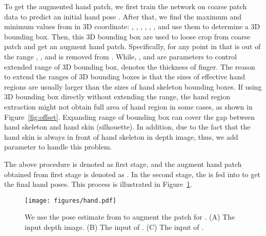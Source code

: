 \documentclass{article}
\begin{document}
To get the augmented hand patch, we first train the network  on coarse patch data  to predict an initial hand pose .
After that, we find the maximum and minimum values from  in 3D coordinate: , , , , , , and use them to determine a 3D bounding box.
Then, this 3D bounding box are used to loose crop from coarse patch and get an augment hand patch. Specifically, for any point  in  that is out of the range , , and  is removed from . While, ,  and  are parameters to control extended range of 3D bounding box,  denotes the thickness of finger.
The reason to extend the ranges of 3D bounding boxes is that the sizes of effective hand regions are usually larger than the sizes of hand skeleton bounding boxes. If using 3D bounding box directly without extending the range, the hand region extraction might not obtain full area of hand region in some cases, as shown in Figure~\ref{fig:offset}. Expanding range of bounding box can cover the gap between hand skeleton and hand skin (silhouette). In addition, due to the fact that the hand skin is always in front of hand skeleton in depth image, thus, we add parameter  to handle this problem.


The above procedure is denoted as first stage, and the augment hand patch obtained from first stage is denoted as .
In the second stage, the  is fed into  to get the final hand poses. This process is illustrated in Figure~\ref{fig:hand_clean}. 


\begin{figure}[t]
	\centering
\texttt{[image: figures/hand.pdf]}
	\caption{We use the pose estimate from  to augment the patch for . (A) The input depth image. (B) The input of . (C) The input of . }
	\label{fig:hand_clean} 
\end{figure}
\end{document}
